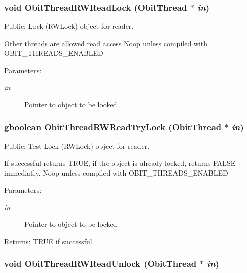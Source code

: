 \subsubsection{\setlength{\rightskip}{0pt plus 5cm}void Obit\-Thread\-RWRead\-Lock ({\bf Obit\-Thread} $\ast$ {\em in})}\label{ObitThread_8h_a9}


Public: Lock (RWLock) object for reader. 

Other threads are allowed read access Noop unless compiled with OBIT\_\-THREADS\_\-ENABLED \begin{Desc}
\item[Parameters:]
\begin{description}
\item[{\em in}]Pointer to object to be locked. \end{description}
\end{Desc}
\subsubsection{\setlength{\rightskip}{0pt plus 5cm}gboolean Obit\-Thread\-RWRead\-Try\-Lock ({\bf Obit\-Thread} $\ast$ {\em in})}\label{ObitThread_8h_a10}


Public: Test Lock (RWLock) object for reader. 

If successful returns TRUE, if the object is already locked, returns FALSE immediatly. Noop unless compiled with OBIT\_\-THREADS\_\-ENABLED \begin{Desc}
\item[Parameters:]
\begin{description}
\item[{\em in}]Pointer to object to be locked. \end{description}
\end{Desc}
\begin{Desc}
\item[Returns:]TRUE if successful \end{Desc}
\subsubsection{\setlength{\rightskip}{0pt plus 5cm}void Obit\-Thread\-RWRead\-Unlock ({\bf Obit\-Thread} $\ast$ {\em in})}\label{ObitThread_8h_a11}



